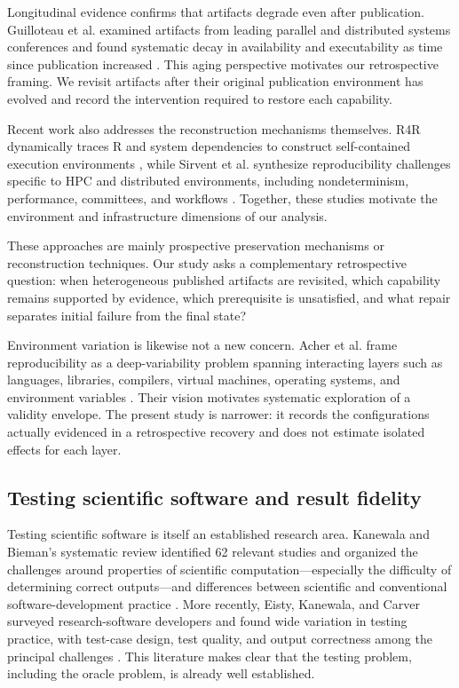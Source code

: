 \documentclass[a4paper,fleqn]{cas-dc}
\begin{document}
Longitudinal evidence confirms that artifacts degrade even after publication. Guilloteau et al. examined artifacts from leading parallel and distributed systems conferences and found systematic decay in availability and executability as time since publication increased \citep{guilloteau2024longevity}. This aging perspective motivates our retrospective framing. We revisit artifacts after their original publication environment has evolved and record the intervention required to restore each capability.

Recent work also addresses the reconstruction mechanisms themselves. R4R dynamically traces R and system dependencies to construct self-contained execution environments \citep{donatbouillud2025r4r}, while Sirvent et al. synthesize reproducibility challenges specific to HPC and distributed environments, including nondeterminism, performance, committees, and workflows \citep{sirvent2025hpc}. Together, these studies motivate the environment and infrastructure dimensions of our analysis.

These approaches are mainly prospective preservation mechanisms or reconstruction techniques. Our study asks a complementary retrospective question: when heterogeneous published artifacts are revisited, which capability remains supported by evidence, which prerequisite is unsatisfied, and what repair separates initial failure from the final state?

Environment variation is likewise not a new concern. Acher et al. frame reproducibility as a deep-variability problem spanning interacting layers such as languages, libraries, compilers, virtual machines, operating systems, and environment variables \citep{acher2024variability}. Their vision motivates systematic exploration of a validity envelope. The present study is narrower: it records the configurations actually evidenced in a retrospective recovery and does not estimate isolated effects for each layer.

\subsection{Testing scientific software and result fidelity}

Testing scientific software is itself an established research area. Kanewala and Bieman's systematic review identified 62 relevant studies and organized the challenges around properties of scientific computation---especially the difficulty of determining correct outputs---and differences between scientific and conventional software-development practice \citep{kanewala2014testing}. More recently, Eisty, Kanewala, and Carver surveyed research-software developers and found wide variation in testing practice, with test-case design, test quality, and output correctness among the principal challenges \citep{eisty2025testing}. This literature makes clear that the testing problem, including the oracle problem, is already well established.
\end{document}
